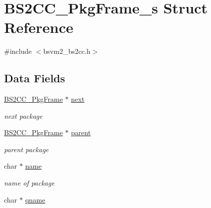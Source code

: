 \hypertarget{structBS2CC__PkgFrame__s}{\section{B\-S2\-C\-C\-\_\-\-Pkg\-Frame\-\_\-s Struct Reference}
\label{structBS2CC__PkgFrame__s}
}


{\ttfamily \#include $<$bsvm2\-\_\-bs2cc.\-h$>$}

\subsection*{Data Fields}
\begin{DoxyCompactItemize}
\item 
\hypertarget{structBS2CC__PkgFrame__s_a1dde13f63c7c96bcf9e4398e925a5b18}{\hyperlink{structBS2CC__PkgFrame__s}{B\-S2\-C\-C\-\_\-\-Pkg\-Frame} $\ast$ \hyperlink{structBS2CC__PkgFrame__s_a1dde13f63c7c96bcf9e4398e925a5b18}{next}}\label{structBS2CC__PkgFrame__s_a1dde13f63c7c96bcf9e4398e925a5b18}

\begin{DoxyCompactList}\small\item\em next package \end{DoxyCompactList}\item 
\hypertarget{structBS2CC__PkgFrame__s_acfb03c1768018d8834954249579547ef}{\hyperlink{structBS2CC__PkgFrame__s}{B\-S2\-C\-C\-\_\-\-Pkg\-Frame} $\ast$ \hyperlink{structBS2CC__PkgFrame__s_acfb03c1768018d8834954249579547ef}{parent}}\label{structBS2CC__PkgFrame__s_acfb03c1768018d8834954249579547ef}

\begin{DoxyCompactList}\small\item\em parent package \end{DoxyCompactList}\item 
\hypertarget{structBS2CC__PkgFrame__s_a417890d48ffa1e5bc1ec3089f97d2a3a}{char $\ast$ \hyperlink{structBS2CC__PkgFrame__s_a417890d48ffa1e5bc1ec3089f97d2a3a}{name}}\label{structBS2CC__PkgFrame__s_a417890d48ffa1e5bc1ec3089f97d2a3a}

\begin{DoxyCompactList}\small\item\em name of package \end{DoxyCompactList}\item 
\hypertarget{structBS2CC__PkgFrame__s_a3af0c7a60184dba63db19b1ccf7b7382}{char $\ast$ \hyperlink{structBS2CC__PkgFrame__s_a3af0c7a60184dba63db19b1ccf7b7382}{qname}}\label{structBS2CC__PkgFrame__s_a3af0c7a60184dba63db19b1ccf7b7382}


\end{DoxyCompactItemize}
